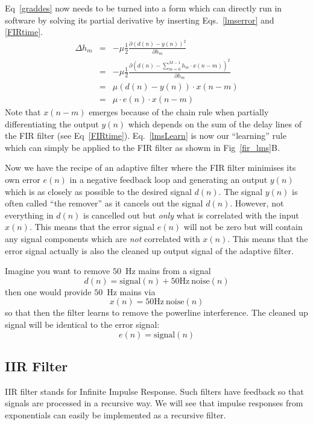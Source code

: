 \documentclass[12pt,a4paper]{article}
\begin{document}
Eq~\ref{graddes} now needs to be turned into a form which can directly run in software by
solving its partial derivative by inserting Eqs.~\ref{lmserror} and \ref{FIRtime}.
\begin{eqnarray}
  \Delta h_m & = & - \mu \frac{1}{2}\frac{\partial \left(d(n)-y(n)\right)^2}{\partial h_m} \\
                & = & - \mu \frac{1}{2}\frac{\partial \left(d(n)-\sum_{m=0}^{M-1} h_m \cdot x(n-m)\right)^2}{\partial h_m} \\
                & = & \mu \left(d(n)-y(n)\right) \cdot x(n-m) \\
                & = & \mu \cdot e(n) \cdot x(n-m) \label{lmsLearn}
\end{eqnarray}
Note that $x(n-m)$ emerges because
of the chain rule when partially differentiating the output
$y(n)$ which depends on the sum of the delay lines of the FIR
filter (see Eq~\ref{FIRtime}). Eq.~\ref{lmsLearn} is now our ``learning''
rule which can simply be applied to the FIR filter as showm in Fig~\ref{fir_lms}B.

Now we have the recipe of an adaptive filter where the FIR filter minimises its
own error $e(n)$ in a negative feedback loop and generating an output
$y(n)$ which is as closely as possible to the desired signal $d(n)$. The signal
$y(n)$ is often called ``the remover'' as it cancels out the signal $d(n)$.
However, not everything in $d(n)$ is cancelled out but \textsl{only} what
is correlated with the input $x(n)$. This means that the error signal
$e(n)$ will not be zero but will contain any signal components which are
\textsl{not} correlated with $x(n)$. This means that the error signal actually
is also the cleaned up output signal of the adaptive filter.

Imagine you want to remove $50$~Hz mains from a signal
\begin{equation}
d(n) = \mathrm{signal}(n) + \mathrm{50Hz~noise}(n)
\end{equation}
then one would provide $50$~Hz mains
via
\begin{equation}
  x(n) = \mathrm{50Hz~noise}(n)
\end{equation}  
so that then the filter learns to remove the powerline
interference. The cleaned up signal will be identical to the error
signal:
\begin{equation}
  e(n) = \mathrm{signal}(n)
\end{equation}


\clearpage
\subsection{IIR Filter}
IIR filter stands for Infinite Impulse Response. Such filters have
feedback so that signals are processed in a recursive way. We will see
that impulse responses from exponentials can easily be implemented as
a recursive filter.
\end{document}
